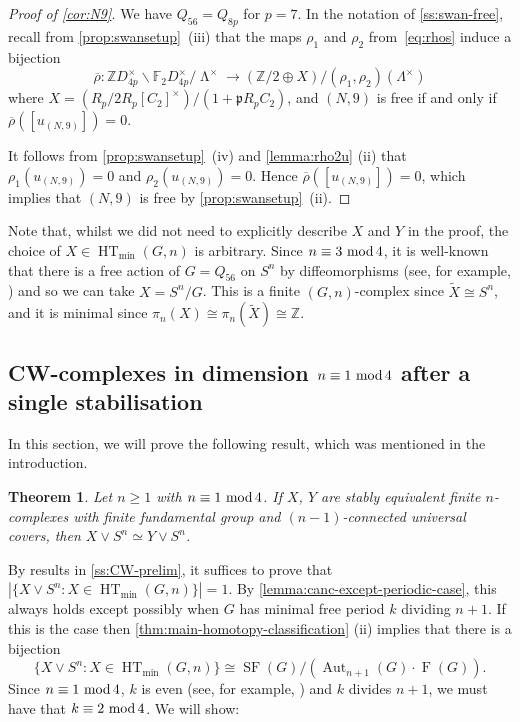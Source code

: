 \documentclass[11pt,leqno,a4paper]{amsart}
\newcommand{\Z}{\mathbb{Z}}
\newcommand{\F}{\mathbb{F}}
\renewcommand{\mod}{\,\,\text{\normalfont mod}\,}
\DeclareMathOperator{\Aut}{Aut}
\DeclareMathOperator{\SF}{SF}
\DeclareMathOperator{\HT}{HT}
\DeclareMathOperator{\FF}{F}
\DeclareMathOperator{\LL}{\Lambda}
\newtheorem{thm}{Theorem}[section]
\theoremstyle{definition}
\theoremstyle{remark}
\theoremstyle{custom}
\newcommand{\wt}{\widetilde}
\begin{document}
\begin{proof}[Proof of \cref{cor:N9}]
We have $Q_{56} = Q_{8p}$ for $p = 7$. In the notation of \cref{ss:swan-free}, recall from \cref{prop:swansetup}~(iii) that the maps $\rho_1$ and $\rho_2$ from~\cref{eq:rhos} induce a bijection
\[
\overline{\rho} : \Z D_{4p}^\times \backslash \F_2 D_{4p}^\times /{\LL^\times}
\longrightarrow (\Z/2 \oplus X )/ (\rho_1,\rho_2)(\Lambda^\times)
\]
where $X = {(R_p/2R_p[C_2]^\times)}/({1+\mathfrak{p}R_pC_2})$, and $(N, 9)$ is free if and only if $\overline \rho([u_{(N, 9)}]) = 0$.

It follows from \cref{prop:swansetup}~(iv) and \cref{lemma:rho2u} (ii) that $\rho_1(u_{(N, 9)})=0$ and $\rho_2(u_{(N, 9)})=0$. Hence $\overline{\rho}([u_{(N, 9)}])=0$, which implies that $(N,9)$ is free by \cref{prop:swansetup}~(ii).
\end{proof}

Note that, whilst we did not need to explicitly describe $X$ and $Y$ in the proof, the choice of $X \in \HT_{\min}(G,n)$ is arbitrary. Since $n \equiv 3 \mod 4$, it is well-known that there is a free action of $G = Q_{56}$ on $S^n$ by diffeomorphisms (see, for example, \cite{Wa78}) and so we can take $X = S^n/G$. This is a finite $(G,n)$-complex since $\wt X \cong S^n$, and it is minimal since $\pi_n(X) \cong \pi_n(\wt X) \cong \Z$.

\subsection{CW-complexes in dimension $n \equiv 1 \mod 4$ after a single stabilisation} \label{ss:CW-extra}

In this section, we will prove the following result, which was mentioned in the introduction.

\begin{thm} \label{thm:all-dimensions}
Let $n \ge 1$ with $n \equiv 1 \mod 4$. If $X$, $Y$ are stably equivalent finite $n$-complexes with finite fundamental group and $(n-1)$-connected universal covers, then $X \vee S^n \simeq Y \vee S^n$.
\end{thm}

By results in \cref{ss:CW-prelim}, it suffices to prove that $|\{X \vee S^n : X \in \HT_{\min}(G,n)\}|=1$. By \cref{lemma:canc-except-periodic-case}, this always holds except possibly when $G$ has minimal free period $k$ dividing $n+1$. If this is the case then \cref{thm:main-homotopy-classification} (ii) implies that there is a bijection
\[ \{X \vee S^n : X \in \HT_{\min}(G,n)\} \cong \SF(G)/(\Aut_{n+1}(G) \cdot \FF(G)).\]
Since $n \equiv 1 \mod 4$, $k$ is even (see, for example, \cite[Proposition 40.2]{Jo03a}) and $k$ divides $n+1$, we must have that $k \equiv 2 \mod 4$. We will show:
\end{document}

